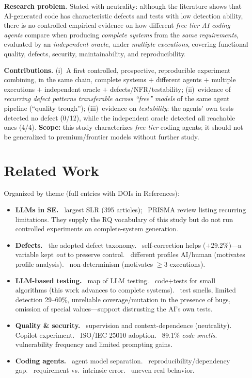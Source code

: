 \documentclass[sigconf,anonymous]{acmart}
\begin{document}
\textbf{Research problem.} Stated with neutrality: although the literature shows that AI-generated code has characteristic defects and tests with low detection ability, there is no controlled empirical evidence on how different \emph{free-tier AI coding agents} compare when producing \emph{complete systems} from the \emph{same requirements}, evaluated by an \emph{independent oracle}, under \emph{multiple executions}, covering functional quality, defects, security, maintainability, and reproducibility.

\textbf{Contributions.} (i)~A first controlled, prospective, reproducible experiment combining, in the same chain, complete systems $+$ different agents $+$ multiple executions $+$ independent oracle $+$ defects/NFR/testability; (ii)~evidence of \emph{recurring defect patterns transferable across ``free'' models} of the same agent pipeline (``quality trough''); (iii)~evidence on \emph{testability}: the agents' own tests detected no defect (0/12), while the independent oracle detected all reachable ones (4/4). \textbf{Scope:} this study characterizes \emph{free-tier} coding agents; it should not be generalized to premium/frontier models without further study.

\section{Related Work}
Organized by theme (full entries with DOIs in References):

\begin{itemize}
\item \textbf{LLMs in SE.}~\cite{A01} largest SLR (395 articles);~\cite{A02} PRISMA review listing recurring limitations. They supply the RQ vocabulary of this study but do not run controlled experiments on complete-system generation.
\item \textbf{Defects.}~\cite{B01} the adopted defect taxonomy.~\cite{B02} self-correction helps ($+$29.2\%)---a variable kept \emph{out} to preserve control.~\cite{B03} different profiles AI/human (motivates profile analysis).~\cite{B04} non-determinism (motivates $\ge$3 executions).
\item \textbf{LLM-based testing.}~\cite{C01} map of LLM testing.~\cite{C02} code+tests for small algorithms (this work advances to complete systems).~\cite{C03,C04,C05,C06} test smells, limited detection 29--60\%, unreliable coverage/mutation in the presence of bugs, omission of special values---support distrusting the AI's own tests.
\item \textbf{Quality \& security.}~\cite{D01,D02} supervision and context-dependence (neutrality).~\cite{D03} Copilot experiment.~\cite{D04} ISO/IEC 25010 adoption.~\cite{D05} 89.1\% \emph{code smells}.~\cite{E01,E02,E03} vulnerability frequency and limited prompting gains.
\item \textbf{Coding agents.}~\cite{F01} agent model separation.~\cite{F02} reproducibility/dependency gap.~\cite{F03} requirement vs.\ intrinsic error.~\cite{F04,F05} uneven real behavior.
\end{itemize}
\end{document}
